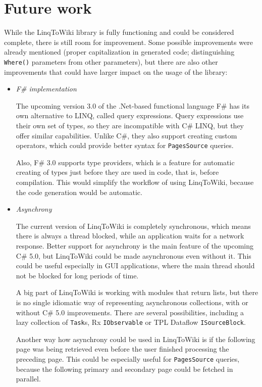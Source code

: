 \chapter{Future work}


While the LinqToWiki library is fully functioning and could be considered complete,
there is still room for improvement.
Some possible improvements were already mentioned
(proper capitalization in generated code;
distinguishing \lstinline{Where()} parameters from other parameters),
but there are also other improvements that could have larger impact on the usage of the library:

\begin{itemize}
\item \emph{F\# implementation}

The upcoming version 3.0 of the .Net-based functional language F\# has its own alternative to LINQ,
called query expressions.
Query expressions use their own set of types, so they are incompatible with C\# LINQ,
but they offer similar capabilities.
Unlike C\#, they also support creating custom operators,
which could provide better syntax for \lstinline{PagesSource} queries.

Also, F\# 3.0 supports type providers, which is a feature for automatic creating of types
just before they are used in code, that is, before compilation.
This would simplify the workflow of using LinqToWiki, because the code generation would be automatic.

\item \emph{Asynchrony}

The current version of LinqToWiki is completely synchronous,
which means there is always a thread blocked, while an application waits for a network response.
Better support for asynchrony is the main feature of the upcoming C\# 5.0,
but LinqToWiki could be made asynchronous even without it.
This could be useful especially in GUI applications, where the main thread should not be blocked for long periods of time.

A big part of LinqToWiki is working with modules that return lists,
but there is no single idiomatic way of representing asynchronous collections,
with or without C\# 5.0 improvements.
There are several possibilities, including a lazy collection of \lstinline{Task}s,
Rx \lstinline{IObservable} or TPL Dataflow \lstinline{ISourceBlock}.

Another way how asynchrony could be used in LinqToWiki is if the following page was being retrieved
even before the user finished processing the preceding page.
This could be especially useful for \lstinline{PagesSource} queries,
because the following primary and secondary page could be fetched in parallel.


\end{itemize}

